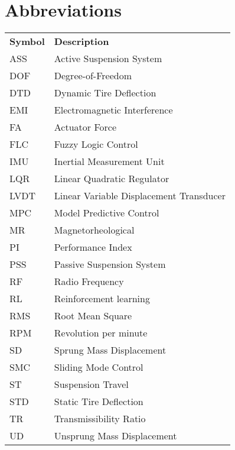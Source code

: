 \begin{longtable}{lll}
	
	
\end{longtable}

\chapter*{Abbreviations}
\thispagestyle{plain}
\begin{flushleft}
	\begin{tabular}{ll}
		
	\textbf{Symbol} & \textbf{Description}\\	
	ASS  & Active Suspension System \\
	DOF  & Degree-of-Freedom \\
	DTD  & Dynamic Tire Deflection \\
	EMI  & Electromagnetic Interference \\
	FA   & Actuator Force \\
	FLC  & Fuzzy Logic Control \\
	IMU  & Inertial Measurement Unit \\
	LQR  & Linear Quadratic Regulator \\
	LVDT & Linear Variable Displacement Transducer \\
	MPC  & Model Predictive Control \\
	MR   & Magnetorheological \\
	PI   & Performance Index \\
	PSS  & Passive Suspension System \\
	RF   & Radio Frequency \\
	RL   & Reinforcement learning \\
	RMS  & Root Mean Square \\
	RPM  & Revolution per minute \\
	SD   & Sprung Mass Displacement \\
	SMC  & Sliding Mode Control \\
	ST   & Suspension Travel \\
	STD  & Static Tire Deflection \\
	TR   & Transmissibility Ratio \\
	UD   & Unsprung Mass Displacement \\
		
		
		
	\end{tabular}
\end{flushleft}